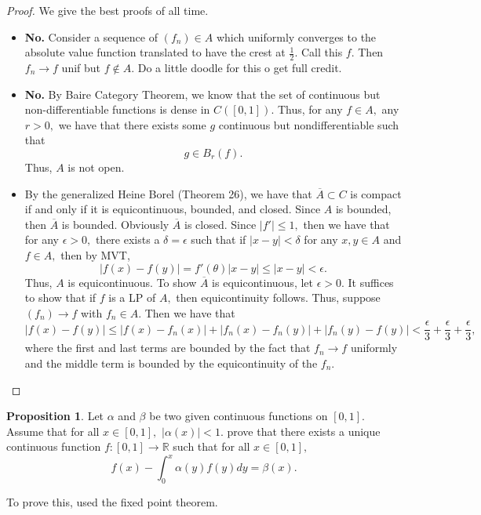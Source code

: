 \documentclass[10pt, oneside]{article}
\newcommand{\bbR}{\mathbb{R}}
\theoremstyle{definition}
\newtheorem{prop}{Proposition}
\begin{document}
\begin{proof}
We give the best proofs of all time. 
    \begin{itemize}
        \item \textbf{No.} Consider a sequence of $(f_n) \in A$ which uniformly converges to the absolute value function translated to have the crest at $\frac{1}{2}.$ Call this $f$. Then $f_n \to f$ unif but $f\notin A.$ Do a little doodle for this o get full credit.
        \item \textbf{No.} By Baire Category Theorem, we know that the set of continuous but non-differentiable functions is dense in $C([0,1]).$ Thus, for any $f\in A,$ any $r>0,$ we have that there exists some $g$ continuous but nondifferentiable such that 
        \[g \in B_r(f).\] Thus, $A$ is not open.
        \item By the generalized Heine Borel (Theorem 26), we have that $\overline{A}\subset C$ is compact if and only if it is equicontinuous, bounded, and closed. Since $A$ is bounded, then $\overline{A}$ is bounded. Obviously $\overline{A}$ is closed. Since $|f'|\leq 1,$ then we have that for any $\epsilon>0,$ there exists a $\delta = \epsilon$ such that if $|x-y|< \delta$ for any $x,y \in A$ and $f\in A,$ then by MVT, \[|f(x) - f(y)| = f'(\theta)|x-y| \leq |x-y| < \epsilon.\] Thus, $A$ is equicontinuous. To show $\overline{A}$ is equicontinuous, let $\epsilon>0.$ It suffices to show that if $f$ is a LP of $A,$ then equicontinuity follows. Thus, suppose $(f_n)\to f$ with $f_n \in A.$ Then we have that 
        \[|f(x) - f(y)|\leq |f(x) - f_n(x)| + |f_n(x) - f_n(y)| + |f_n(y) - f(y)| < \frac{\epsilon}{3} + \frac{\epsilon}{3} + \frac{\epsilon}{3},\] where the first and last terms are bounded by the fact that $f_n \to f$ uniformly and the middle term is bounded by the equicontinuity of the $f_n.$
    \end{itemize}
\end{proof}
\begin{prop}
    Let $\alpha$ and $\beta$ be two given continuous functions on $[0,1].$ Assume that for all $x\in [0,1],$ $|\alpha(x)|<1.$ prove that there exists a unique continuous function $f: [0,1]\to \bbR$ such that for all $x\in [0,1],$
    \[f(x) - \int_0^x \alpha(y)f(y)dy = \beta(x).\]
\end{prop}
To prove this, used the fixed point theorem.

\newpage
\end{document}
